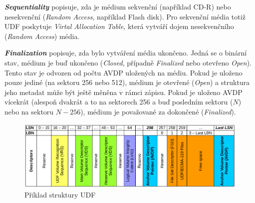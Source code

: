 \textbf{\textit{Sequentiality}} popisuje, zda je médium sekvenční (například CD-R) nebo nesekvenční (\textit{Random Access}, například Flash disk). Pro sekvenční média totiž UDF poskytuje \textit{Virtal Allocation Table}, která vytváří dojem nesekvenčního (\textit{Random Access}) média.

\textbf{\textit{Finalization}} popisuje, zda bylo vytváření média ukončeno. Jedná se o binární stav, médium je buď ukončeno (\textit{Closed}, případně \textit{Finalized} nebo otevřeno \textit{Open}). Tento stav je odvozen od počtu AVDP uložených na médiu. Pokud je uloženo pouze jediné (na sektoru 256 nebo 512), médium je otevřené (\textit{Open}) a struktura jeho metadat může být ještě měněna v rámci zápisu. Pokud je uloženo AVDP vícekrát (alespoň dvakrát a to na sektorech 256 a buď posledním sektoru ($N$) nebo na sektoru $N-256$), médium je považované za dokončené (\textit{Finalized}).
 
\begin{figure}[] 
    \centering
    \includegraphics[scale=0.45]{obrazky/UDF-example-schema.png}
    \caption{Příklad struktury UDF}
    \label{fig:udf-example}
\end{figure}

